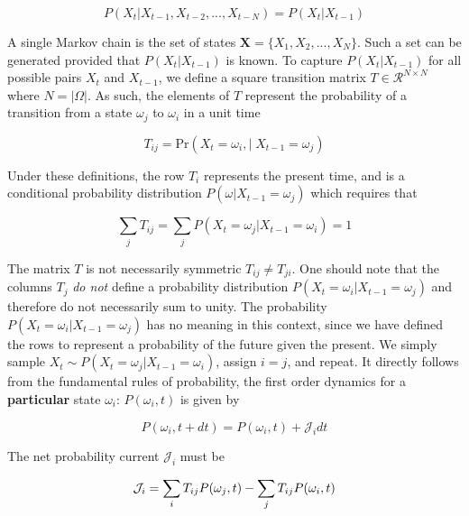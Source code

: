 \documentclass{ucetd}
\begin{document}
\begin{equation*}
P(X_{t}|X_{t-1}, X_{t-2}, ..., X_{t-N}) = P(X_{t}|X_{t-1})
\end{equation*}

A single Markov chain is the set of states $\bm{X} = \{X_{1},X_{2},...,X_{N}\}$. Such a set can be generated provided that $P(X_{t}|X_{t-1})$ is known. To capture $P(X_{t}|X_{t-1})$ for all possible pairs $X_{t}$ and $X_{t-1}$, we define a square transition matrix $T\in \mathcal{R}^{N\times N}$ where $N = |\Omega|$. As such, the elements of $T$ represent the probability of a transition from a state $\omega_{j}$ to $\omega_{i}$ in a unit time

\begin{equation*}
T_{ij} = \mathrm{Pr}\left(X_{t}=\omega_{i}, | \;X_{t-1}=\omega_{j}\right)
\end{equation*}

Under these definitions, the row $T_{i}$ represents the present time, and is a conditional  probability distribution $P(\omega | X_{t-1} = \omega_{j})$ which requires that

\begin{equation*}
\sum_{j}T_{ij} = \sum_{j} P(X_{t} = \omega_{j} | X_{t-1} = \omega_{i}) = 1
\end{equation*}

The matrix $T$ is not necessarily symmetric $T_{ij} \neq T_{ji}$. One should note that the columns $T_{j}$ \emph{do not} define a probability distribution $P(X_{t} = \omega_{i} | X_{t-1} = \omega_{j})$ and therefore do not necessarily sum to unity. The probability $P(X_{t} = \omega_{i} | X_{t-1} = \omega_{j})$ has no meaning in this context, since we have defined the rows to represent a probability of the future given the present. We simply sample $X_{t} \sim P(X_{t} = \omega_{j} | X_{t-1} = \omega_{i})$, assign $i=j$, and repeat. It directly follows from the fundamental rules of probability, the first order dynamics for a \textbf{particular} state $\omega_{i}$: $P(\omega_{i},t)$ is given by

\begin{equation}
P(\omega_{i},t+dt) = P(\omega_{i},t) + \mathcal{J}_{i}dt
\end{equation}

The net probability current $\mathcal{J}_{i}$ must be 

\begin{equation*}
\mathcal{J}_{i} = \sum_{i}T_{ij}P(\omega_{j},t) - \sum_{j}T_{ij}P(\omega_{i},t)\\
\end{equation*}
\end{document}
